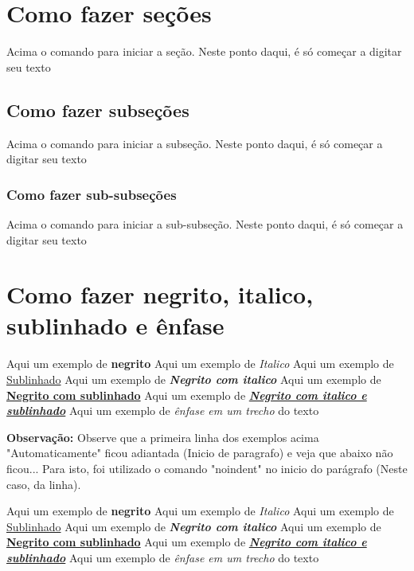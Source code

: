 \documentclass[12pt, a4paper]{article}
\begin{document}
\newpage
\section{Como fazer seções}

Acima o comando para iniciar a seção. Neste ponto daqui, é só começar a digitar seu texto

\subsection{Como fazer subseções}

Acima o comando para iniciar a subseção. Neste ponto daqui, é só começar a digitar seu texto

\subsubsection{Como fazer sub-subseções}

Acima o comando para iniciar a sub-subseção. Neste ponto daqui, é só começar a digitar seu texto

\newpage
\section{Como fazer negrito, italico, sublinhado e ênfase}

Aqui um exemplo de \textbf{negrito} \newline
Aqui um exemplo de \textit{Italico} \newline
Aqui um exemplo de \underline{Sublinhado} \newline
Aqui um exemplo de \textbf{\textit{Negrito com italico}} \newline
Aqui um exemplo de \textbf{\underline{Negrito com sublinhado}} \newline
Aqui um exemplo de \textbf{\textit{\underline{Negrito com italico e sublinhado}}} \newline
Aqui um exemplo de \emph{ênfase em um trecho} do texto \newline

\textbf{Observação:} Observe que a primeira linha dos exemplos acima "Automaticamente" ficou adiantada (Inicio de paragrafo) e veja que abaixo não ficou... Para isto, foi utilizado o comando "noindent" no inicio do parágrafo (Neste caso, da linha). \newline


\noindent Aqui um exemplo de \textbf{negrito} \newline
Aqui um exemplo de \textit{Italico} \newline
Aqui um exemplo de \underline{Sublinhado} \newline
Aqui um exemplo de \textbf{\textit{Negrito com italico}} \newline
Aqui um exemplo de \textbf{\underline{Negrito com sublinhado}} \newline
Aqui um exemplo de \textbf{\textit{\underline{Negrito com italico e sublinhado}}} \newline
Aqui um exemplo de \emph{ênfase em um trecho} do texto
\end{document}
